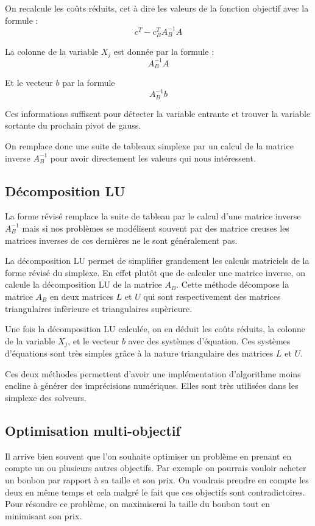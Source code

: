 \documentclass[a4paper,10pt]{article}
\theoremstyle{plain}
\begin{document}
On recalcule les coûts réduits, cet à dire les valeurs de la fonction objectif avec la formule : $$c^T-c_B^TA_B^{-1}A$$

La colonne de la variable $X_j$ est donnée par la formule : $$A_B^{-1}A$$

Et le vecteur $b$ par la formule $$A_B^{-1}b$$

Ces informations suffisent pour détecter la variable entrante et trouver la variable sortante du prochain pivot de gauss.

On remplace donc une suite de tableaux simplexe par un calcul de la matrice inverse $A_B^{-1}$ pour avoir directement les valeurs qui nous intéressent.\\

\subsection{Décomposition LU}
La forme révisé remplace la suite de tableau par le calcul d'une matrice inverse $A_B^{-1}$ mais si nos problèmes se modélisent souvent par des matrice creuses les matrices inverses de ces dernières ne le sont généralement pas.

La décomposition LU permet de simplifier grandement les calculs matriciels de la forme révisé du simplexe. En effet plutôt que de calculer une matrice inverse, on calcule la décomposition LU de la matrice $A_B$. Cette méthode décompose la matrice $A_B$ en deux matrices $L$ et $U$ qui sont respectivement des matrices triangulaires infèrieure et triangulaires supèrieure.

Une fois la décomposition LU calculée, on en déduit les coûts réduits, la colonne de la variable $X_j$, et le vecteur $b$ avec des systèmes d'équation. Ces systèmes d'équations sont très simples grâce à la nature triangulaire des matrices $L$ et $U$.

Ces deux méthodes permettent d'avoir une implémentation d'algorithme moins encline à générer des imprécisions numériques. Elles sont très utilisées dans les simplexe des solveurs.\\

\subsection{Optimisation multi-objectif}
Il arrive bien souvent que l'on souhaite optimiser un problème en prenant en compte un ou plusieurs autres objectifs. Par exemple on pourrais vouloir acheter un bonbon par rapport à sa taille et son prix. On voudrais prendre en compte les deux en même temps et cela malgré le fait que ces objectifs sont contradictoires. Pour résoudre ce problème, on maximiserai la taille du bonbon tout en minimisant son prix.
\end{document}
